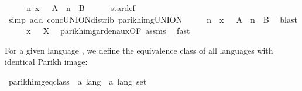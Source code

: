 \begin{isabellebody}
\ \ \isamarkupfalse%
\ \isamarkupfalse%
\ {\isachardoublequoteopen}{\isasymexists}n{\isachardot}{\kern0pt}\ x\ {\isasymin}\ {\isasymPsi}\ {\isacharparenleft}{\kern0pt}A\ {\isacharcircum}{\kern0pt}{\isacharcircum}{\kern0pt}\ n\ {\isacharat}{\kern0pt}{\isacharat}{\kern0pt}\ B{\isacharparenright}{\kern0pt}{\isachardoublequoteclose}\isanewline
\ \ \ \ \isamarkupfalse%
\ star{\isacharunderscore}{\kern0pt}def\ \isamarkupfalse%
\ {\isacharparenleft}{\kern0pt}simp\ add{\isacharcolon}{\kern0pt}\ conc{\isacharunderscore}{\kern0pt}UNION{\isacharunderscore}{\kern0pt}distrib{\isacharparenleft}{\kern0pt}{}{\isacharparenright}{\kern0pt}\ parikh{\isacharunderscore}{\kern0pt}img{\isacharunderscore}{\kern0pt}UNION{\isacharparenright}{\kern0pt}\isanewline
\ \ \isamarkupfalse%
\ \isamarkupfalse%
\ n\ \ {\isachardoublequoteopen}x\ {\isasymin}\ {\isasymPsi}\ {\isacharparenleft}{\kern0pt}A\ {\isacharcircum}{\kern0pt}{\isacharcircum}{\kern0pt}\ n\ {\isacharat}{\kern0pt}{\isacharat}{\kern0pt}\ B{\isacharparenright}{\kern0pt}{\isachardoublequoteclose}\ \isamarkupfalse%
\ blast\isanewline
\ \ \isamarkupfalse%
\ \isamarkupfalse%
\ {\isachardoublequoteopen}x\ {\isasymin}\ {\isasymPsi}\ X{\isachardoublequoteclose}\ \isamarkupfalse%
\ parikh{\isacharunderscore}{\kern0pt}img{\isacharunderscore}{\kern0pt}arden{\isacharunderscore}{\kern0pt}aux{\isacharbrackleft}{\kern0pt}OF\ assms{\isacharbrackright}{\kern0pt}\ \isamarkupfalse%
\ fast\isanewline
{}\isamarkupfalse%
%
\endisatagproof
{\isafoldproof}%
%
\isadelimproof
%
\endisadelimproof
%
\isadelimdocument
%
\endisadelimdocument
%
\isatagdocument
%
\isamarkuptrue%
%
\endisatagdocument
{\isafolddocument}%
%
\isadelimdocument
%
\endisadelimdocument
%
\begin{isamarkuptext}%
For a given language , we define the equivalence class of all languages with identical Parikh
image:%
\end{isamarkuptext}\isamarkuptrue%
\isamarkupfalse%
\ parikh{\isacharunderscore}{\kern0pt}img{\isacharunderscore}{\kern0pt}eq{\isacharunderscore}{\kern0pt}class\ {\isacharcolon}{\kern0pt}{\isacharcolon}{\kern0pt}\ {\isachardoublequoteopen}{\isacharprime}{\kern0pt}a\ lang\ {\isasymRightarrow}\ {\isacharprime}{\kern0pt}a\ lang\ set{\isachardoublequoteclose}\ \isanewline

\end{isabellebody}
